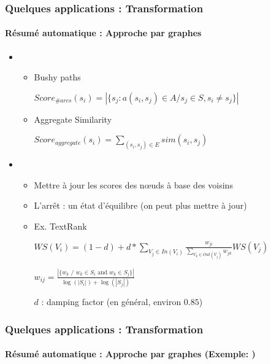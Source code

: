 \documentclass[xcolor=table]{beamer}
\begin{document}
\begin{frame}
	\frametitle{Quelques applications : Transformation}
	\framesubtitle{Résumé automatique : Approche par graphes}
	
	\begin{itemize}
		\item {}
		\begin{itemize}
			\item Bushy paths 
			
			\hspace{.5cm}$Score_{\#arcs}(s_i) = |\{ s_j : a(s_i, s_j) \in A / s_j \in S, s_i \neq s_j \}|$
			
			\item Aggregate Similarity
			
			\hspace{.5cm}$Score_{aggregate}(s_i) = \sum\limits_{(s_i, s_j) \in E} sim(s_i, s_j)$
		\end{itemize}
		\item {}
		\begin{itemize}
			\item Mettre à jour les scores des nœuds à base des voisins 
			\item L'arrêt : un état d'équilibre (on peut plus mettre à jour)
			\item Ex. TextRank \cite{04-mihalcea-tarau}
			
			$WS(V_i) = ( 1 - d) + d * \sum\limits_{V_j \in In(V_i)} \frac{w_{ji}}{\sum\limits_{V_k \in Out(V_j)} w_{jk}} WS(V_j)$
			
			$w_{ij} = \frac{|\{w_k \text{ / } w_k \in S_i \text{ and } w_k \in S_j\}|}{\log(|S_i|) + \log(|S_j|)}$
			
			$ d $ : damping factor (en général, environ $ 0.85 $)
		\end{itemize}
	\end{itemize}

\end{frame}

\begin{frame}
	\frametitle{Quelques applications : Transformation}
	\framesubtitle{Résumé automatique : Approche par graphes (Exemple: \cite{21-aries-al})}
	
	\begin{center}
	\end{center}
	
\end{frame}
\end{document}
